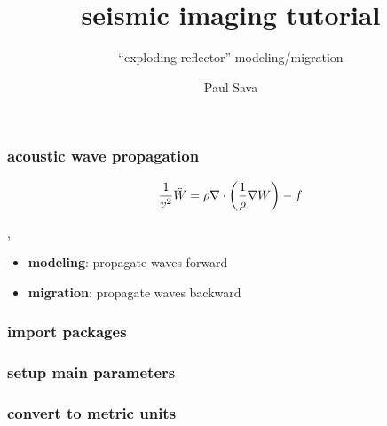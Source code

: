 


\title[]{seismic imaging tutorial}
\subtitle{``exploding reflector'' modeling/migration}
\author[]{Paul Sava}
\date{}
\logo{}

\def\big#1{\begin{center} \LARGE \textbf{#1} \end{center}}
\def\cen#1{\begin{center}        \textbf{#1} \end{center}}

 { \cwpcover }


\begin{frame} \frametitle{acoustic wave propagation}

\[
\frac{1}{v^2} \ddot{W} = 
\rho \nabla \cdot {\left (\frac{1}{\rho} \nabla {W} \right)} -f
\]

\sep

\begin{itemize}
   \item \textbf{modeling}: propagate waves forward
   \item \textbf{migration}: propagate waves backward 
\end{itemize}

\end{frame}
\cwpnote{}

\begin{frame} \frametitle{import packages}

\end{frame}
\cwpnote{}

\begin{frame} \frametitle{setup main parameters}

\end{frame}
\cwpnote{}

\begin{frame} \frametitle{convert to metric units}

\end{frame}
\cwpnote{}


